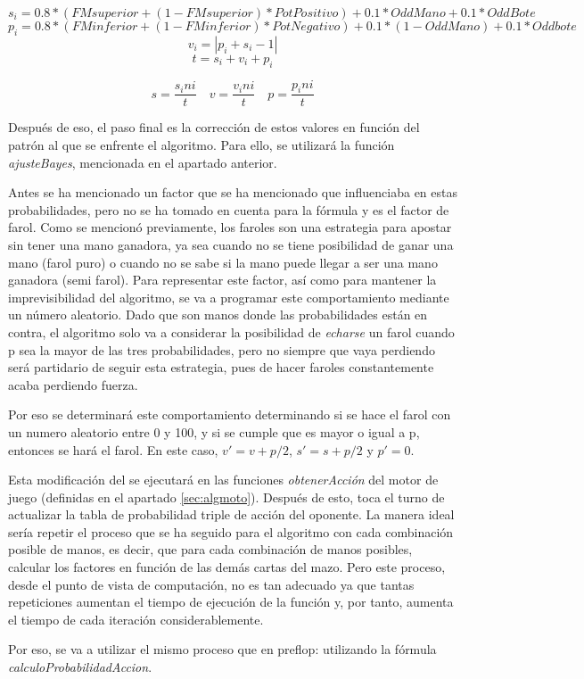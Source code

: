 \[
s_i= 0.8*(FMsuperior+(1- FMsuperior)*PotPositivo)+0.1*OddMano+0.1*OddBote
\]
\[
p_i=0.8*(FMinferior+(1- FMinferior)*PotNegativo)+0.1*(1-OddMano)+0.1*Oddbote
\]
\[
v_i=|p_i+s_i-1|
\]
\[
t=s_i+v_i+p_i
\]

\[
s=\frac{s_ini}{t}  \quad  v=\frac{v_ini}{t} \quad  p=\frac{p_ini}{t}
\]

Después de eso, el paso final es la corrección de estos valores en función del patrón al que se enfrente el algoritmo. Para ello, se utilizará la función \textit{ajusteBayes}, mencionada en el apartado anterior. 

Antes se ha mencionado un factor que se ha mencionado que influenciaba en estas probabilidades, pero no se ha tomado en cuenta para la fórmula y es el factor de farol. Como se mencionó previamente, los faroles son una estrategia para apostar sin tener una mano ganadora, ya sea cuando no se tiene posibilidad de ganar una mano (farol puro) o cuando no se sabe si la mano puede llegar a ser una mano ganadora (semi farol).
Para representar este factor, así como para mantener la imprevisibilidad del algoritmo, se va a programar este comportamiento mediante un número aleatorio. Dado que son manos donde las probabilidades están en contra, el algoritmo solo va a considerar la posibilidad de \textit{echarse} un farol cuando p sea la mayor de las tres probabilidades, pero no siempre que vaya perdiendo será partidario de seguir esta estrategia, pues de hacer faroles constantemente acaba perdiendo fuerza. 

Por eso se determinará este comportamiento determinando si se hace el farol con un numero aleatorio entre 0 y 100, y si se cumple que  es mayor o igual a p, entonces se hará el farol.
En este caso, $v'=v+p/2$, $s'=s+p/2$ y $p'=0$.


Esta modificación del se ejecutará en las funciones \textit{obtenerAcción} del motor de juego (definidas en el apartado \ref{sec:algmoto}).
Después de esto, toca el turno de actualizar la tabla de probabilidad triple de acción del oponente.
La manera ideal sería repetir el proceso que se ha seguido para el algoritmo con cada combinación posible de manos, es decir, que para cada combinación de manos posibles, calcular los factores en función de las demás cartas del mazo. Pero este proceso, desde el punto de vista de computación, no es tan adecuado ya que tantas repeticiones aumentan el tiempo de ejecución de la función y, por tanto, aumenta el tiempo de cada iteración considerablemente.

Por eso, se va a utilizar el mismo proceso que en preflop: utilizando la fórmula \textit{calculoProbabilidadAccion}.

